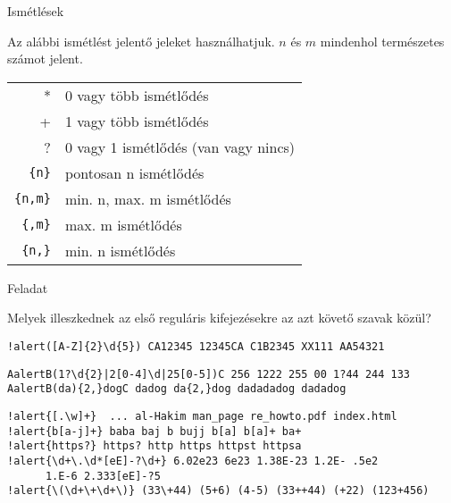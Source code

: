 \documentclass[
    ignorenonframetext
    ]{beamer}
\begin{document}
\begin{frame}[fragile]
    {Ismétlések}

    Az alábbi ismétlést jelentő jeleket használhatjuk. $n$ és $m$
    mindenhol természetes számot jelent.

    \vfill
    \begin{tabular}{rl}
        * & 0 vagy több ismétlődés\\
        + & 1 vagy több ismétlődés\\
        ? & 0 vagy 1 ismétlődés (van vagy nincs)\\
        \verb"{n}" & pontosan n ismétlődés\\
        \verb"{n,m}" & min. n, max. m ismétlődés\\
        \verb"{,m}" & max. m ismétlődés\\
        \verb"{n,}" & min. n ismétlődés
    \end{tabular}
\end{frame}

\begin{frame}
    [fragile]{Feladat}

    Melyek illeszkednek az első reguláris kifejezésekre az azt követő
    szavak közül?

\begin{Verbatim}[commandchars=!()]
!alert([A-Z]{2}\d{5}) CA12345 12345CA C1B2345 XX111 AA54321
\end{Verbatim}
\begin{Verbatim}[commandchars=ABC]
AalertB(1?\d{2}|2[0-4]\d|25[0-5])C 256 1222 255 00 1?44 244 133
AalertB(da){2,}dogC dadog da{2,}dog dadadadog dadadog
\end{Verbatim}
\begin{Verbatim}[commandchars=!\{\}]
!alert{[.\w]+}  ... al-Hakim man_page re_howto.pdf index.html
!alert{b[a-j]+} baba baj b bujj b[a] b[a]+ ba+
!alert{https?} https? http https httpst httpsa
!alert{\d+\.\d*[eE]-?\d+} 6.02e23 6e23 1.38E-23 1.2E- .5e2
      1.E-6 2.333[eE]-?5
!alert{\(\d+\+\d+\)} (33\+44) (5+6) (4-5) (33++44) (+22) (123+456)
\end{Verbatim}
\end{frame}
\end{document}
